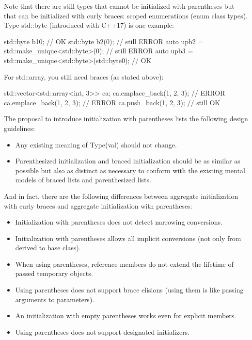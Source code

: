 Note that there are still types that cannot be initialized with parentheses but that can be initialized with curly braces: scoped enumerations (enum class types). Type std::byte (introduced with C++17) is one example:

\begin{cpp}
std::byte b1{0}; // OK
std::byte b2(0); // still ERROR
auto upb2 = std::make_unique<std::byte>(0); // still ERROR
auto upb3 = std::make_unique<std::byte>(std::byte{0}); // OK
\end{cpp}

For std::array, you still need braces (as stated above):

\begin{cpp}
std::vector<std::array<int, 3>> ca;
ca.emplace_back(1, 2, 3); // ERROR
ca.emplace_back({1, 2, 3}); // ERROR
ca.push_back({1, 2, 3}); // still OK
\end{cpp}


The proposal to introduce initialization with parentheses lists the following design guidelines:

\begin{itemize}
\item 
Any existing meaning of Type(val) should not change.

\item 
Parenthesized initialization and braced initialization should be as similar as possible but also as distinct as necessary to conform with the existing mental models of braced lists and parenthesized lists.
\end{itemize}

And in fact, there are the following differences between aggregate initialization with curly braces and aggregate initialization with parentheses:

\begin{itemize}
\item 
Initialization with parentheses does not detect narrowing conversions.

\item 
Initialization with parentheses allows all implicit conversions (not only from derived to base class).

\item
When using parentheses, reference members do not extend the lifetime of passed temporary objects.

\item
Using parentheses does not support brace elisions (using them is like passing arguments to parameters).

\item
An initialization with empty parentheses works even for explicit members.

\item
Using parentheses does not support designated initializers.
\end{itemize}

